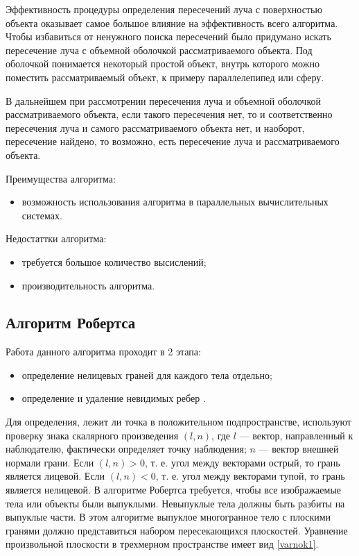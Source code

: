 Эффективность процедуры определения пересечений луча с поверхностью объекта оказывает самое большое влияние на эффективность всего алгоритма. Чтобы избавиться от ненужного поиска пересечений было придумано искать пересечение луча с объемной оболочкой рассматриваемого объекта. Под оболочкой понимается некоторый простой объект, внутрь которого можно поместить рассматриваемый объект, к примеру параллелепипед или сферу. 

В дальнейшем при рассмотрении пересечения луча и объемной оболочкой рассматриваемого объекта, если такого пересечения нет, то и соответственно пересечения луча и самого рассматриваемого объекта нет, и наоборот, пересечение найдено, то возможно, есть пересечение луча и рассматриваемого объекта. 

Преимущества алгоритма:
\begin{itemize}
	\item возможность использования алгоритма в параллельных вычислительных системах.
\end{itemize}

Недостаттки алгоритма:
\begin{itemize}
	\item требуется большое количество высислений;
	\item производительность алгоритма.
\end{itemize}

\subsection{Алгоритм Робертса}

Работа данного алгоритма проходит в 2 этапа:
\begin{itemize}
	\item определение нелицевых граней для каждого тела отдельно;
	\item определение и удаление невидимых ребер \cite{demin}.
\end{itemize}


Для определения, лежит ли точка в положительном подпространстве, используют проверку знака скалярного произведения $(l, n)$, где $l$ --- вектор, направленный к наблюдателю, фактически определяет точку наблюдения; $n$ --- вектор внешней нормали грани. Если $(l, n) > 0$, т. е. угол между векторами острый, то грань является лицевой. Если $(l, n) < 0$, т. е. угол между векторами тупой, то грань является нелицевой.
В алгоритме Робертса требуется, чтобы все изображаемые тела или объекты были выпуклыми. Невыпуклые тела должны быть разбиты на выпуклые части. В этом алгоритме выпуклое многогранное тело с плоскими гранями должно представиться набором пересекающихся плоскостей. Уравнение произвольной плоскости в трехмерном пространстве имеет вид \ref{varnok1}.

